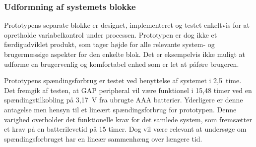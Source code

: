 \subsubsection{Udformning af systemets blokke}
Prototypens separate blokke er designet, implementeret og testet enkeltvis for at opretholde variabelkontrol under processen. Prototypen er dog ikke et færdigudviklet produkt, som tager højde for alle relevante system- og brugermæssige aspekter for den enkelte blok. Det er eksempelvis ikke muligt at udforme en brugervenlig og komfortabel enhed som er let at påføre brugeren.

Prototypens spændingsforbrug er testet ved benyttelse af systemet i 2,5~time. Det fremgik af testen, at GAP peripheral vil være funktionel i 15,48 timer ved en spændingstilkobling på 3,17~V fra ubrugte AAA batterier. Yderligere er denne antagelse men hensyn til et lineært spændingsforbrug for prototypen. Denne varighed overholder det funktionelle krav for det samlede system, som fremsætter et krav på en batterilevetid på 15 timer. Dog vil være relevant at undersøge om spændingsforbruget har en lineær sammenhæng over længere tid. %

